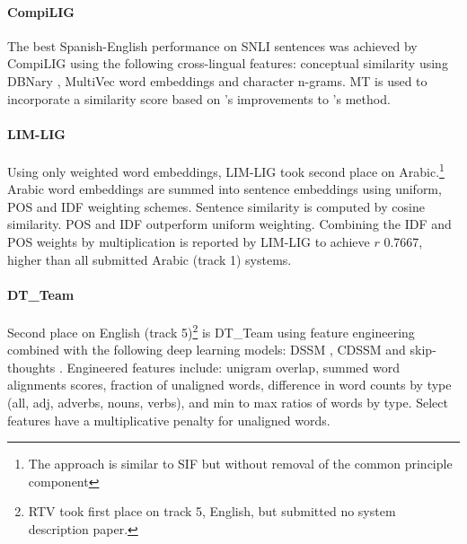 \documentclass[11pt,a4paper]{article}
\begin{document}
\paragraph{CompiLIG \textnormal{\cite{ferrero-EtAl:2017:SemEval}}} The best Spanish-English performance on SNLI sentences was achieved by CompiLIG using the following cross-lingual features: conceptual similarity using DBNary \cite{Serasset2015}, MultiVec word embeddings \cite{AlexandreBerard2016} and character n-grams. MT is used to incorporate a similarity score based on 's improvements to 's method.

\paragraph{LIM-LIG \textnormal{\cite{nagoudi-ferrero-schwab:2017:SemEval}}} Using only weighted word embeddings, LIM-LIG took second place on Arabic.\footnote{The approach is similar to SIF \cite{sif2017} but without removal of the common principle component} Arabic word embeddings are summed into sentence embeddings using uniform, POS and IDF weighting schemes. Sentence similarity is computed by cosine similarity. POS and IDF outperform uniform weighting. Combining the IDF and POS weights by multiplication is reported by LIM-LIG to achieve $r$ 0.7667, higher than all submitted Arabic (track 1) systems. 

\paragraph{DT\_Team \textnormal{\cite{maharjan-EtAl:2017:SemEval}}} Second place on English (track 5)\footnote{RTV took first place on track 5, English, but submitted no system description paper.} is DT\_Team using feature engineering combined with the following deep learning models: DSSM \cite{Huang2013}, CDSSM \cite{YelongShen2014} and skip-thoughts \cite{RyanKiros2015}.  Engineered features include: unigram overlap, summed word alignments scores, fraction of unaligned words, difference in word counts by type (all, adj, adverbs, nouns, verbs), and min to max ratios of words by type. Select features have a multiplicative penalty for unaligned words. 
\end{document}

